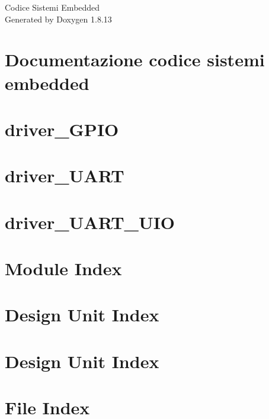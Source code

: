 \documentclass[twoside]{book}
\newcommand{\+}{\discretionary{\mbox{\scriptsize$\hookleftarrow$}}{}{}}
\newcommand{\clearemptydoublepage}{%
  \newpage{\pagestyle{empty}\cleardoublepage}%
}
\begin{document}
\hypersetup{pageanchor=false,
             bookmarksnumbered=true,
             pdfencoding=unicode
            }
\begin{titlepage}
\vspace*{7cm}
\begin{center}%
{\Large Codice Sistemi Embedded }\\
\vspace*{1cm}
{\large Generated by Doxygen 1.8.13}\\
\end{center}
\end{titlepage}
\clearemptydoublepage
{}
\tableofcontents
\clearemptydoublepage
{}
\hypersetup{pageanchor=true}

\chapter{Documentazione codice sistemi embedded}
\label{index}\hypertarget{index}{}
\chapter{driver\+\_\+\+G\+P\+IO}
\label{driver_GPIO}

\chapter{driver\+\_\+\+U\+A\+RT}
\label{driver_UART}

\chapter{driver\+\_\+\+U\+A\+R\+T\+\_\+\+U\+IO}
\label{driver_UART_UIO}

\chapter{Module Index}

\chapter{Design Unit Index}

\chapter{Design Unit Index}

\chapter{File Index}

\end{document}
